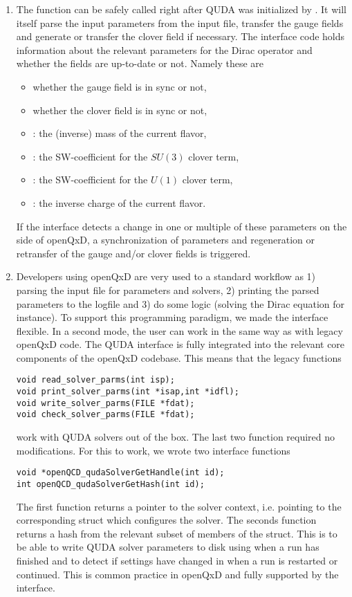 \begin{enumerate}
  \item{The function can be safely called right after QUDA was initialized by . It will itself parse the input parameters from the input file, transfer the gauge fields and generate or transfer the clover field if necessary. The interface code holds information about the relevant parameters for the Dirac operator and whether the fields are up-to-date or not. Namely these are
  \begin{itemize}
    \item whether the gauge field is in sync or not,
    \item whether the clover field is in sync or not,
    \item {}: the (inverse) mass of the current flavor,
    \item {}: the SW-coefficient for the $SU(3)$ clover term,
    \item {}: the SW-coefficient for the $U(1)$ clover term,
    \item {}: the inverse charge of the current flavor.
  \end{itemize}
  If the interface detects a change in one or multiple of these parameters on the side of openQxD, a synchronization of parameters and regeneration or retransfer of the gauge and/or clover fields is triggered.}
  \item{Developers using openQxD are very used to a standard workflow as 1) parsing the input file for parameters and solvers, 2) printing the parsed parameters to the logfile and 3) do some logic (solving the Dirac equation for instance). To support this programming paradigm, we made the interface flexible. In a second mode, the user can work in the same way as with legacy openQxD code. The QUDA interface is fully integrated into the relevant core components of the openQxD codebase. This means that the legacy functions
  \begin{verbatim}
void read_solver_parms(int isp);
void print_solver_parms(int *isap,int *idfl);
void write_solver_parms(FILE *fdat);
void check_solver_parms(FILE *fdat);
  \end{verbatim}
  work with QUDA solvers out of the box. The last two function required no modifications. For this to work, we wrote two interface functions
  \begin{verbatim}
void *openQCD_qudaSolverGetHandle(int id);
int openQCD_qudaSolverGetHash(int id);
  \end{verbatim}
  The first function returns a pointer to the solver context, i.e. pointing to the corresponding  struct which configures the solver. The seconds function returns a hash from the relevant subset of members of the  struct. This is to be able to write QUDA solver parameters to disk using  when a run has finished and to detect if settings have changed in  when a run is restarted or continued. This is common practice in openQxD and fully supported by the interface.
  }
\end{enumerate}

